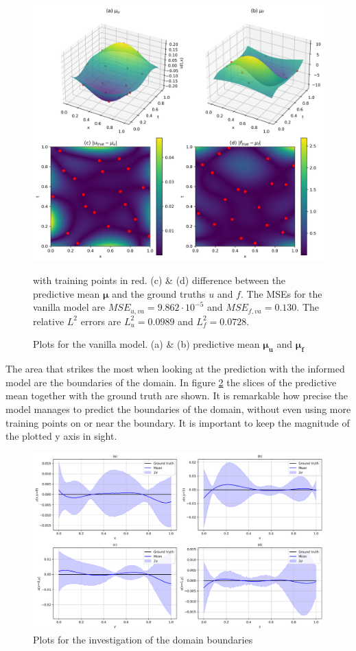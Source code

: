 \documentclass{article}
\begin{document}
\begin{figure}[htbp!]
    \centering
    \includegraphics[width=1\textwidth]{../final_examples/poisson/GPy_mean_diff.png}
    \caption{Plots for the vanilla model. (a) \& (b) predictive mean $\bm{\mu_u}$ and $\bm{\mu_f}$} with training points in red. (c) \& (d) difference between the predictive mean $\bm{\mu}$ and the ground truths $u$ and $f$. The MSEs for the vanilla model are $MSE_{u,va} = 9.862  \cdot 10^{-5}$ and $MSE_{f,va} = 0.130$. The relative $L^2$ errors are $L^2_u = 0.0989$ and $L^2_f = 0.0728$.
    ~\label{fig:poisson_GPY}
\end{figure}
The area that strikes the most when looking at the prediction with the informed model are the boundaries of the domain. In figure \ref{fig:poisson_boundaries} the slices of the predictive mean together with the ground truth are shown. It is remarkable how precise the model manages to predict the boundaries of the domain, without even using more training points on or near the boundary. It is important to keep the magnitude of the plotted y axis in sight.
\begin{figure}
    \centering
    \includegraphics[width=1\textwidth]{../final_examples/poisson/boundaries.png}
    \caption{Plots for the investigation of the domain boundaries}
    \label{fig:poisson_boundaries}
\end{figure}
\end{document}
